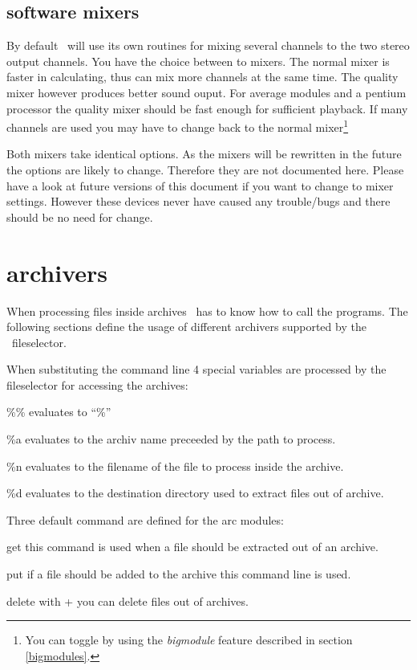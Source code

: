 \subsection{software mixers}
By default \cp\ will use its own routines for mixing several channels
to the two stereo output channels. You have the choice between to
mixers. The normal mixer is faster in calculating, thus can mix more
channels at the same time.  The quality mixer however produces better
sound ouput. For average modules and a pentium processor the quality
mixer should be fast enough for sufficient playback. If many channels
are used you may have to change back to the normal mixer\footnote{You
can toggle by using the \emph{bigmodule} feature described in section
\ref{bigmodules}.}

Both mixers take identical options. As the mixers will be rewritten in
the future the options are likely to change. Therefore they are not
documented here. Please have a look at future versions of this
document if you want to change to mixer settings. However these
devices never have caused any trouble/bugs and there should be no need
for change.

\section{archivers}
When processing files inside archives \cp\ has to know how to call the
programs. The following sections define the usage of different
archivers supported by the \cp\ fileselector.

When substituting the command line 4 special variables are processed
by the fileselector for accessing the archives:
\begin{dojlist}
\item[\%\%] evaluates to ``\%''
\item[\%a] evaluates to the archiv name preceeded by the path to process.
\item[\%n] evaluates to the filename of the file to process inside the archive.
\item[\%d] evaluates to the destination directory used to extract files out 
of archive.
\end{dojlist}

Three default command are defined for the arc modules:
\begin{dojlist}
\item[get] this command is used when a file should be extracted out of an 
archive.
\item[put] if a file should be added to the archive this command line is used.
\item[delete] with + you can delete files out of archives.
\end{dojlist}

